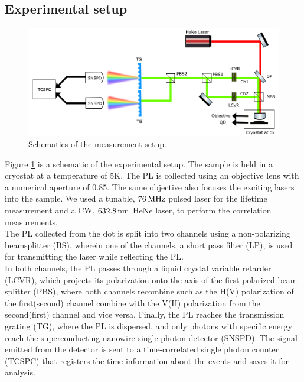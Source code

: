 \subsection{Experimental setup}
	\begin{figure}[H]
		\centering
		\includegraphics[scale=0.60]{figures/Experiment_schematics.png}
		\caption{Schematics of the measurement setup.}
		\label{fig:experiment_schematics}
	\end{figure}
Figure \ref{fig:experiment_schematics}  is a schematic of the experimental setup. The sample is held in a cryostat  at a temperature of 5K. The PL is collected using an objective lens with a numerical aperture of 0.85. The same objective also focuses the exciting lasers into the sample. We used a tunable, $76\,\rm MHz$ pulsed laser for the lifetime measurement and a CW, $632.8\,\rm nm$ HeNe laser, to perform the correlation measurements. \\
The PL collected from the dot is split into two channels using a non-polarizing beamsplitter (BS), wherein one of the channels, a short pass filter (LP), is used for transmitting the laser while reflecting the PL.\\
In both channels, the PL passes through a liquid crystal variable retarder (LCVR), which projects its polarization onto the axis of the first polarized beam splitter (PBS), where both channels recombine such as the H(V) polarization of the first(second) channel combine with the V(H) polarization from the second(first) channel and vice versa. Finally, the PL reaches the transmission grating (TG), where the PL is dispersed, and only photons with specific energy reach the superconducting nanowire single photon detector (SNSPD). The signal emitted from the detector is sent to a time-correlated single photon counter (TCSPC) that registers the time information about the events and saves it for analysis. 


